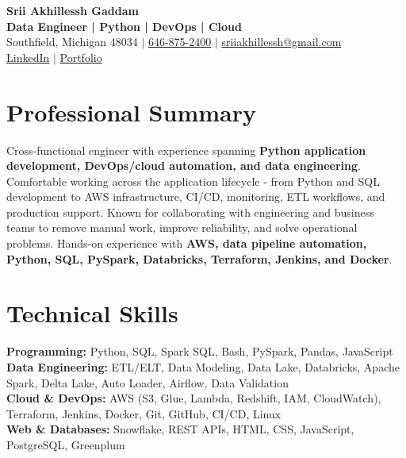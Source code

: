 \documentclass[letterpaper,10pt]{article}
\begin{document}
\fontsize{9.35pt}{10.45pt}\selectfont

\begin{center}
    {\LARGE \textbf{Srii Akhillessh Gaddam}} \\[-1pt]
    \textbf{Data Engineer | Python | DevOps | Cloud} \\[2pt]
    Southfield, Michigan 48034 $|$
    \href{tel:6468752400}{646-875-2400} $|$
    \href{mailto:sriiakhillessh@gmail.com}{sriiakhillessh@gmail.com} \\[1pt]
    \href{https://www.linkedin.com/in/srii-akhiilessh-gaddam-b48668191/}{LinkedIn} $|$
    \href{https://sriiakhillesshg.github.io/portfolio/}{Portfolio}
\end{center}
\vspace{-8pt}

\section{Professional Summary}
\small{Cross-functional engineer with experience spanning \textbf{Python application development, DevOps/cloud automation, and data engineering}. Comfortable working across the application lifecycle - from Python and SQL development to AWS infrastructure, CI/CD, monitoring, ETL workflows, and production support. Known for collaborating with engineering and business teams to remove manual work, improve reliability, and solve operational problems. Hands-on experience with \textbf{AWS, data pipeline automation, Python, SQL, PySpark, Databricks, Terraform, Jenkins, and Docker}.}

\section{Technical Skills}
\small{
\textbf{Programming:} Python, SQL, Spark SQL, Bash, PySpark, Pandas, JavaScript \\
\textbf{Data Engineering:} ETL/ELT, Data Modeling, Data Lake, Databricks, Apache Spark, Delta Lake, Auto Loader, Airflow, Data Validation \\
\textbf{Cloud \& DevOps:} AWS (S3, Glue, Lambda, Redshift, IAM, CloudWatch), Terraform, Jenkins, Docker, Git, GitHub, CI/CD, Linux \\
\textbf{Web \& Databases:} Snowflake, REST APIs, HTML, CSS, JavaScript, PostgreSQL, Greenplum
}
\end{document}
